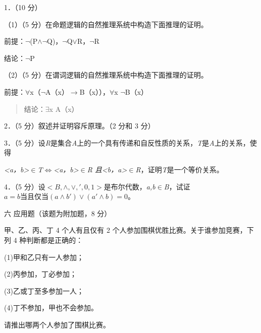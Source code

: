 \documentclass[fontset=exam]{exam-zh}
\begin{document}
\par{}\smallskip

1．（10 分）

（1）（5 分）在命题逻辑的自然推理系统中构造下面推理的证明。

前提：\(\neg\)(P\(\land\)\(\neg\)Q)，\(\neg\)Q\(\lor\)R，\(\neg\)R

结论：\(\neg\)P

（2）（5 分）在谓词逻辑的自然推理系统中构造下面推理的证明。

前提：\(\forall\)x（\(\neg\)A（x）\(\to\)B（x）），\(\forall\)x \(\neg\)B（x）

\begin{quote}
结论：\(\exists\)x A（x）
\end{quote}

2．（5 分）叙述并证明容斥原理。（2 分和 3 分）

3．（5 分）设\emph{R}是集合\emph{A}上的一个具有传递和自反性质的关系，\emph{T}是\emph{A}上的关系，使得

\emph{\textless a，b\textgreater{}\(\in\)T\(\Leftrightarrow\)\textless a，b\textgreater{}\(\in\)R 且\textless b，a\textgreater{}\(\in\)R}，证明\emph{T}是一个等价关系。

4．（5 分）设\(< B, \land , \vee ,',0,1 >\)是布尔代数，\emph{a,b}\(\in\)\emph{B}，试证\(a = b\text{当且仅当}(a \land b') \vee (a' \land b) = 0\)。

六 应用题（该题为附加题，8 分）

甲、乙、丙、丁 4 个人有且仅有 2 个人参加围棋优胜比赛。关于谁参加竞赛，下列 4 种判断都是正确的：

(1)甲和乙只有一人参加；

(2)丙参加，丁必参加；

(3)乙或丁至多参加一人；

(4)丁不参加，甲也不会参加。

请推出哪两个人参加了围棋比赛。
\end{document}
